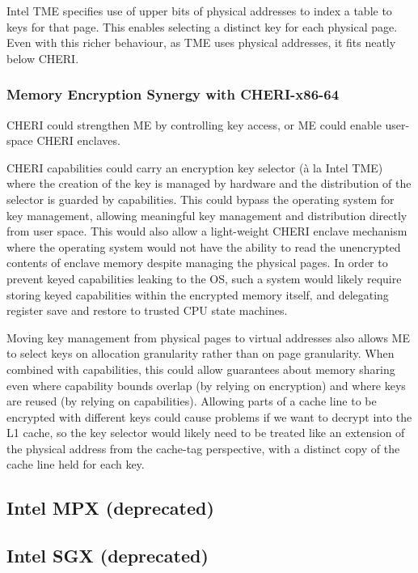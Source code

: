 Intel TME specifies use of upper bits of physical addresses to index a
table to keys for that page.
This enables selecting a distinct key for each physical page.
Even with this richer behaviour, as TME uses physical addresses,
it fits neatly below CHERI.

\subsubsection{Memory Encryption Synergy with CHERI-x86-64}

CHERI could strengthen ME by controlling key access, or
ME could enable user-space CHERI enclaves.

CHERI capabilities could carry an encryption key selector (à la
Intel TME) where the creation of the key is managed by hardware
and the distribution of the selector is guarded by capabilities.
This could bypass the operating system for key management, allowing
meaningful key management and distribution directly from user space.
This would also allow a light-weight CHERI enclave mechanism where
the operating system would not have the ability to read the unencrypted
contents of enclave memory despite managing the physical pages.
In order to prevent keyed capabilities leaking to the OS, such a
system would likely require storing keyed capabilities within the
encrypted memory itself, and delegating register save and restore
to trusted CPU state machines.

Moving key management from physical pages to virtual addresses also
allows ME to select keys on allocation granularity rather than on
page granularity.
When combined with capabilities, this could allow guarantees about
memory sharing even where capability bounds overlap (by relying on
encryption) and where keys are
reused (by relying on capabilities).
Allowing parts of a cache line to be encrypted with different keys
could cause problems if we want to decrypt into the L1 cache, so the
key selector would likely need to be treated like an extension of
the physical address from the cache-tag perspective, with a distinct
copy of the cache line held for each key. 

\subsection{Intel MPX (deprecated)}

\subsection{Intel SGX (deprecated)}
